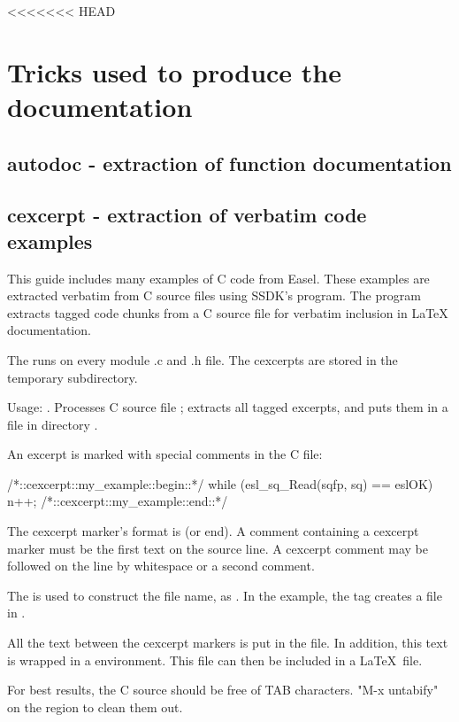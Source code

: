 <<<<<<< HEAD
\section{Tricks used to produce the documentation}

\subsection{autodoc - extraction of function documentation}


\subsection{cexcerpt - extraction of verbatim code examples}

This guide includes many examples of C code from Easel. These examples
are extracted verbatim from C source files using SSDK's
 program. The  program extracts tagged
code chunks from a C source file for verbatim inclusion in LaTeX
documentation.

The  runs  on every
module .c and .h file. The cexcerpts are stored in the temporary
 subdirectory.

Usage: . Processes C source file
; extracts all tagged excerpts, and puts them in a file
in directory .

An excerpt is marked with special comments in the C file:
\begin{cchunk}
/*::cexcerpt::my_example::begin::*/
   while (esl_sq_Read(sqfp, sq) == eslOK)
     { n++; }
/*::cexcerpt::my_example::end::*/
\end{cchunk}

The cexcerpt marker's format is  (or
end). A comment containing a cexcerpt marker must be the first text on
the source line. A cexcerpt comment may be followed on the line by
whitespace or a second comment.

The  is used to construct the file name, as
.  In the example, the tag  creates
a file  in .

All the text between the cexcerpt markers is put in the file.  In
addition, this text is wrapped in a  environment.  This
file can then be included in a \LaTeX\ file.

For best results, the C source should be free of TAB characters.
"M-x untabify" on the region to clean them out.

